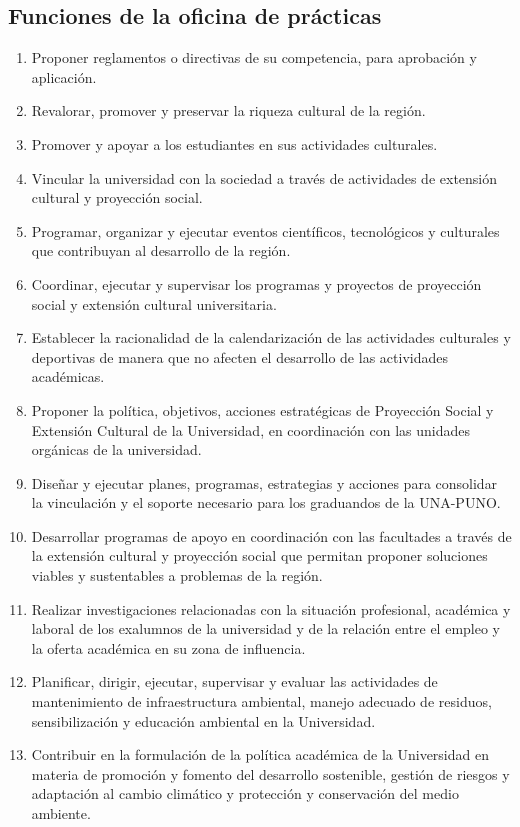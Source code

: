 \subsection{Funciones de la oficina de prácticas}
\begin{enumerate}
    \item Proponer reglamentos o directivas de su competencia, para aprobación y aplicación.
    \item Revalorar, promover y preservar la riqueza cultural de la región.   
    \item Promover y apoyar a los estudiantes en sus actividades culturales.	
    \item Vincular la universidad con la sociedad a través de actividades de extensión cultural y proyección social.
    \item Programar, organizar y ejecutar eventos científicos, tecnológicos y culturales que contribuyan al desarrollo de la región.
    \item Coordinar, ejecutar y supervisar los programas y proyectos de proyección social y extensión cultural universitaria.
    \item Establecer la racionalidad de la calendarización de las actividades culturales y deportivas de manera que no afecten el desarrollo de las actividades académicas.
    \item Proponer la política, objetivos, acciones estratégicas de Proyección Social y Extensión Cultural de la Universidad, en coordinación con las unidades orgánicas de la universidad.
    \item Diseñar y ejecutar planes, programas, estrategias y acciones para consolidar la vinculación y el soporte necesario para los graduandos de la UNA-PUNO.
    \item Desarrollar programas de apoyo en coordinación con las facultades a través de la extensión cultural y proyección social que permitan proponer soluciones viables y sustentables a problemas de la región.
    \item Realizar investigaciones relacionadas con la situación profesional, académica y laboral de los exalumnos de la universidad y de la relación entre el empleo y la oferta académica en su zona de influencia.
    \item Planificar, dirigir, ejecutar, supervisar y evaluar las actividades de mantenimiento de infraestructura ambiental, manejo adecuado de residuos, sensibilización y educación ambiental en la Universidad.
    \item Contribuir en la formulación de la política académica de la Universidad en materia de promoción y fomento del desarrollo sostenible, gestión de riesgos y adaptación al cambio climático y protección y conservación del medio ambiente.

\end{enumerate}
